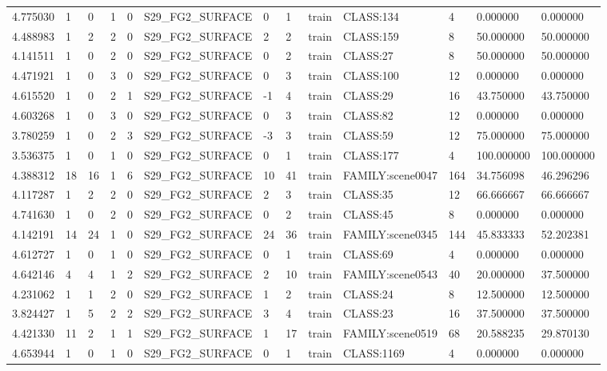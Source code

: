\begin{tabular}{lllllllllllll}
4.775030 & 1 & 0 & 1 & 0 & S29\_FG2\_SURFACE & 0 & 1 & train & CLASS:134 & 4 & 0.000000 & 0.000000 \\
4.488983 & 1 & 2 & 2 & 0 & S29\_FG2\_SURFACE & 2 & 2 & train & CLASS:159 & 8 & 50.000000 & 50.000000 \\
4.141511 & 1 & 0 & 2 & 0 & S29\_FG2\_SURFACE & 0 & 2 & train & CLASS:27 & 8 & 50.000000 & 50.000000 \\
4.471921 & 1 & 0 & 3 & 0 & S29\_FG2\_SURFACE & 0 & 3 & train & CLASS:100 & 12 & 0.000000 & 0.000000 \\
4.615520 & 1 & 0 & 2 & 1 & S29\_FG2\_SURFACE & -1 & 4 & train & CLASS:29 & 16 & 43.750000 & 43.750000 \\
4.603268 & 1 & 0 & 3 & 0 & S29\_FG2\_SURFACE & 0 & 3 & train & CLASS:82 & 12 & 0.000000 & 0.000000 \\
3.780259 & 1 & 0 & 2 & 3 & S29\_FG2\_SURFACE & -3 & 3 & train & CLASS:59 & 12 & 75.000000 & 75.000000 \\
3.536375 & 1 & 0 & 1 & 0 & S29\_FG2\_SURFACE & 0 & 1 & train & CLASS:177 & 4 & 100.000000 & 100.000000 \\
4.388312 & 18 & 16 & 1 & 6 & S29\_FG2\_SURFACE & 10 & 41 & train & FAMILY:scene0047 & 164 & 34.756098 & 46.296296 \\
4.117287 & 1 & 2 & 2 & 0 & S29\_FG2\_SURFACE & 2 & 3 & train & CLASS:35 & 12 & 66.666667 & 66.666667 \\
4.741630 & 1 & 0 & 2 & 0 & S29\_FG2\_SURFACE & 0 & 2 & train & CLASS:45 & 8 & 0.000000 & 0.000000 \\
4.142191 & 14 & 24 & 1 & 0 & S29\_FG2\_SURFACE & 24 & 36 & train & FAMILY:scene0345 & 144 & 45.833333 & 52.202381 \\
4.612727 & 1 & 0 & 1 & 0 & S29\_FG2\_SURFACE & 0 & 1 & train & CLASS:69 & 4 & 0.000000 & 0.000000 \\
4.642146 & 4 & 4 & 1 & 2 & S29\_FG2\_SURFACE & 2 & 10 & train & FAMILY:scene0543 & 40 & 20.000000 & 37.500000 \\
4.231062 & 1 & 1 & 2 & 0 & S29\_FG2\_SURFACE & 1 & 2 & train & CLASS:24 & 8 & 12.500000 & 12.500000 \\
3.824427 & 1 & 5 & 2 & 2 & S29\_FG2\_SURFACE & 3 & 4 & train & CLASS:23 & 16 & 37.500000 & 37.500000 \\
4.421330 & 11 & 2 & 1 & 1 & S29\_FG2\_SURFACE & 1 & 17 & train & FAMILY:scene0519 & 68 & 20.588235 & 29.870130 \\
4.653944 & 1 & 0 & 1 & 0 & S29\_FG2\_SURFACE & 0 & 1 & train & CLASS:1169 & 4 & 0.000000 & 0.000000 \\

\end{tabular}
